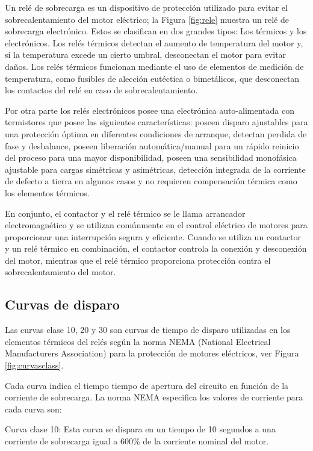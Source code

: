 Un relé de sobrecarga es un dispositivo de protección utilizado para evitar el sobrecalentamiento del motor eléctrico; la Figura \ref{fig:rele} muestra un relé de sobrecarga electrónico. Estos se clasifican en dos grandes tipos: Los térmicos y los electrónicos. Los relés térmicos detectan el aumento de temperatura del motor y, si la temperatura excede un cierto umbral, desconectan el motor para evitar daños. Los relés térmicos funcionan mediante el uso de elementos de medición de temperatura, como fusibles de alección eutéctica o bimetálicos, que desconectan los contactos del relé en caso de sobrecalentamiento.

Por otra parte los relés electrónicos posee una electrónica auto-alimentada con termistores que posee las siguientes características: poseen disparo ajustables para una protección óptima en diferentes condiciones de arranque, detectan  perdida de fase y desbalance, poseen liberación automática/manual para un rápido reinicio del proceso para una mayor disponibilidad, poseen una sensibilidad monofásica ajustable para cargas simétricas y asimétricas, detección integrada de la corriente de defecto a tierra en algunos casos y no requieren compensación térmica como los elementos térmicos. 


En conjunto, el contactor y el relé térmico se le llama arrancador electromagnético y se utilizan comúnmente en el control eléctrico de motores para proporcionar una interrupción segura y eficiente. Cuando se utiliza un contactor y un relé térmico en combinación, el contactor controla la conexión y desconexión del motor, mientras que el relé térmico proporciona protección contra  el sobrecalentamiento del motor.

\subsection{Curvas de disparo}

Las curvas clase 10, 20 y 30 son curvas de tiempo de disparo utilizadas en los elementos térmicos del relés según la norma NEMA (National Electrical Manufacturers Association) para la protección de motores eléctricos, ver Figura \ref{fig:curvasclass}.

Cada curva indica el tiempo tiempo de apertura del circuito  en función de la corriente de sobrecarga. La norma NEMA especifica los valores de corriente para cada curva son:

Curva clase 10: Esta curva se dispara en un tiempo de 10 segundos a una corriente de sobrecarga igual a 600\% de la corriente nominal del motor.

